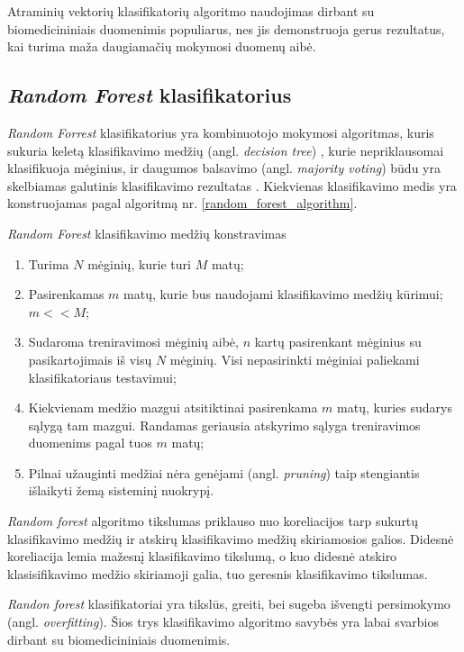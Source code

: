 Atraminių vektorių klasifikatorių algoritmo naudojimas dirbant su biomedicininiais duomenimis populiarus, nes jis demonstruoja gerus rezultatus, kai turima maža daugiamačių mokymosi duomenų aibė. 




\subsection{\textit{Random Forest} klasifikatorius}

\textit{Random Forrest} klasifikatorius yra kombinuotojo mokymosi algoritmas, kuris sukuria keletą klasifikavimo medžių (angl. \textit{decision tree}) \cite{DBLP:books/mk/HanK2000}, kurie  nepriklausomai klasifikuoja mėginius, ir daugumos balsavimo (angl. \textit{majority voting}) būdu yra skelbiamas galutinis klasifikavimo rezultatas \cite{breiman1984classification}. Kiekvienas klasifikavimo medis yra konstruojamas pagal algoritmą nr. \ref{random_forest_algorithm}.
\begin{algorithm}
 \caption{\textit{Random Forest} klasifikavimo medžių konstravimas}
 \label{random_forest_algorithm}
 \begin{enumerate}
  \item Turima $N$ mėginių, kurie turi $M$ matų;
  \item Pasirenkamas $m$ matų, kurie bus naudojami klasifikavimo medžių kūrimui; $m << M$;
  \item Sudaroma treniravimosi mėginių aibė, $n$ kartų pasirenkant mėginius su pasikartojimais iš visų $N$ mėginių. Visi nepasirinkti mėginiai paliekami klasifikatoriaus testavimui; 
  \item Kiekvienam medžio mazgui atsitiktinai pasirenkama $m$ matų, kuries sudarys sąlygą tam mazgui. Randamas geriausia atskyrimo sąlyga treniravimos duomenims pagal tuos $m$ matų;
  \item Pilnai užauginti medžiai nėra genėjami (angl. \textit{pruning}) taip stengiantis išlaikyti žemą sisteminį nuokrypį.
 \end{enumerate}
\end{algorithm}

\textit{Random forest} algoritmo tikslumas priklauso nuo koreliacijos tarp sukurtų klasifikavimo medžių ir atskirų klasifikavimo medžių skiriamosios galios. Didesnė koreliacija lemia mažesnį klasifikavimo tikslumą, o kuo didesnė atskiro klasisifikavimo medžio skiriamoji galia, tuo geresnis klasifikavimo tikslumas.

\textit{Randon forest} klasifikatoriai yra tikslūs, greiti, bei sugeba išvengti persimokymo (angl. \textit{overfitting}). Šios trys klasifikavimo algoritmo savybės yra labai svarbios dirbant su biomedicininiais duomenimis. 
